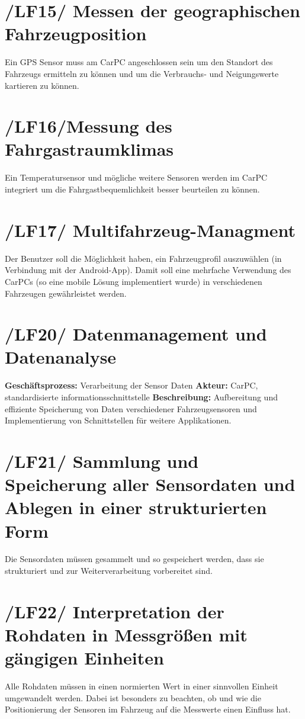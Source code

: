 \section{/LF15/ Messen der geographischen Fahrzeugposition}
Ein GPS Sensor muss am CarPC angeschlossen sein um den Standort des Fahrzeugs ermitteln zu können und um die Verbrauchs- und Neigungswerte kartieren zu können.

\section{/LF16/Messung des Fahrgastraumklimas}
Ein Temperatursensor und mögliche weitere Sensoren werden im CarPC integriert um die Fahrgastbequemlichkeit besser beurteilen zu können.

\section{/LF17/ Multifahrzeug-Managment}
Der Benutzer soll die Möglichkeit haben, ein Fahrzeugprofil auszuwählen (in Verbindung mit der Android-App). Damit soll eine mehrfache Verwendung des CarPCs (so eine mobile Lösung implementiert wurde) in verschiedenen Fahrzeugen gewährleistet werden.

\newpage

\section{/LF20/ Datenmanagement und Datenanalyse}
\textbf{Geschäftsprozess:}	Verarbeitung der Sensor Daten
\newline
\textbf{Akteur:}		CarPC, standardisierte informationsschnittstelle
\newline
\textbf{Beschreibung:} Aufbereitung und effiziente Speicherung von Daten verschiedener Fahrzeugsensoren und Implementierung von Schnittstellen für weitere Applikationen. 

\section{/LF21/ Sammlung und Speicherung aller Sensordaten und Ablegen in einer strukturierten Form}
Die Sensordaten müssen gesammelt und so gespeichert werden, dass sie strukturiert und zur Weiterverarbeitung vorbereitet sind.

\section{/LF22/ Interpretation der Rohdaten in Messgrößen mit gängigen Einheiten}
Alle Rohdaten müssen in einen normierten Wert in einer sinnvollen Einheit umgewandelt werden. Dabei ist besonders zu beachten, ob und wie die Positionierung der Sensoren im Fahrzeug auf die Messwerte einen Einfluss hat.

